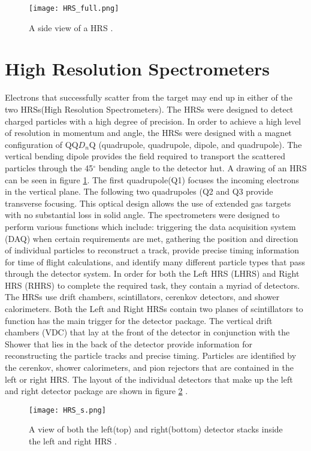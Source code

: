 \begin{figure}[t]
	\centering
	\texttt{[image: HRS\_full.png]}
	\caption{A side view of a HRS \cite{HallA}.
		\label{hrsfull}}
\end{figure}

\section{High Resolution Spectrometers}\label{sec:HRS}
Electrons that successfully scatter from the target may end up in either of the two HRSs(High Resolution Spectrometers). The HRSs were designed to detect charged particles with a high degree of precision. 
In order to achieve a high level of resolution in momentum and angle, the HRSs were designed with a magnet configuration of QQ$D_n$Q (quadrupole, quadrupole, dipole, and quadrupole). The vertical bending dipole provides the field required to transport the scattered particles through the 45$^\circ$ bending angle to the detector hut. A drawing of an HRS can be seen in figure \ref{hrsfull}. The first quadrupole(Q1) focuses the incoming electrons in the vertical plane. The following two quadrupoles (Q2 and Q3 provide transverse focusing. This optical design allows the use of extended gas targets with no substantial loss in solid angle\cite{HallA}.  The spectrometers were designed to perform various functions which include: triggering the data acquisition system (DAQ) when certain requirements are met, gathering the position and direction of individual particles to reconstruct a track, provide precise timing information for time of flight calculations, and identify many different particle types that pass through the detector system. In order for both the Left HRS (LHRS) and Right HRS (RHRS) to  complete the required task, they contain a myriad of detectors. The HRSs use drift chambers, scintillators, cerenkov detectors, and shower calorimeters. Both the Left and Right HRSs contain two planes of scintillators to function has the main trigger for the detector package. The vertical drift chambers (VDC) that lay at the front of the detector in conjunction with the Shower that lies in the back of the detector provide information for reconstructing the particle tracks and precise timing. Particles are identified by the cerenkov, shower calorimeters, and pion rejectors that are contained in the left or right HRS. The layout of the individual detectors that make up the left and right detector package are shown in figure \ref{hrsss}  \cite{HallA}.
\begin{figure}[t]
	\centering
	\texttt{[image: HRS\_s.png]}
	\caption{A view of both the left(top) and right(bottom) detector stacks inside the left and right HRS \cite{HallA}.
	\label{hrsss}}
\end{figure}

